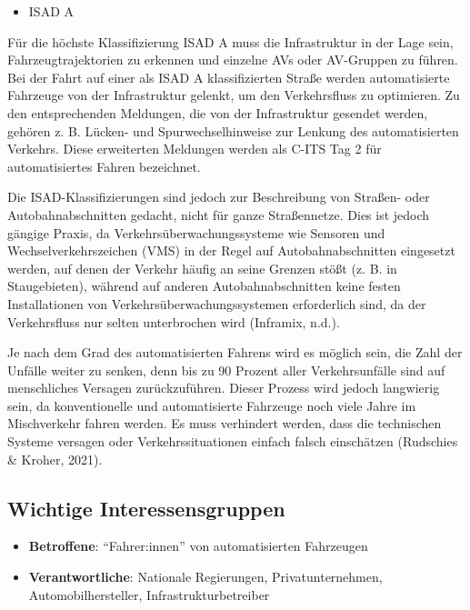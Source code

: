 \documentclass[
]{book}
\providecommand{\tightlist}{%
  \setlength{\itemsep}{0pt}\setlength{\parskip}{0pt}}
\begin{document}
\begin{itemize}
\tightlist
\item
  ISAD A
\end{itemize}

Für die höchste Klassifizierung ISAD A muss die Infrastruktur in der Lage sein, Fahrzeugtrajektorien zu erkennen und einzelne AVs oder AV-Gruppen zu führen. Bei der Fahrt auf einer als ISAD A klassifizierten Straße werden automatisierte Fahrzeuge von der Infrastruktur gelenkt, um den Verkehrsfluss zu optimieren. Zu den entsprechenden Meldungen, die von der Infrastruktur gesendet werden, gehören z. B. Lücken- und Spurwechselhinweise zur Lenkung des automatisierten Verkehrs. Diese erweiterten Meldungen werden als C-ITS Tag 2 für automatisiertes Fahren bezeichnet.

Die ISAD-Klassifizierungen sind jedoch zur Beschreibung von Straßen- oder Autobahnabschnitten gedacht, nicht für ganze Straßennetze. Dies ist jedoch gängige Praxis, da Verkehrsüberwachungssysteme wie Sensoren und Wechselverkehrszeichen (VMS) in der Regel auf Autobahnabschnitten eingesetzt werden, auf denen der Verkehr häufig an seine Grenzen stößt (z. B. in Staugebieten), während auf anderen Autobahnabschnitten keine festen Installationen von Verkehrsüberwachungssystemen erforderlich sind, da der Verkehrsfluss nur selten unterbrochen wird (Inframix, n.d.).

Je nach dem Grad des automatisierten Fahrens wird es möglich sein, die Zahl der Unfälle weiter zu senken, denn bis zu 90 Prozent aller Verkehrsunfälle sind auf menschliches Versagen zurückzuführen. Dieser Prozess wird jedoch langwierig sein, da konventionelle und automatisierte Fahrzeuge noch viele Jahre im Mischverkehr fahren werden. Es muss verhindert werden, dass die technischen Systeme versagen oder Verkehrssituationen einfach falsch einschätzen (Rudschies \& Kroher, 2021).

\hypertarget{wichtige-interessensgruppen-19}{%
\subsection*{Wichtige Interessensgruppen}\label{wichtige-interessensgruppen-19}}

\begin{itemize}
\tightlist
\item
  \textbf{Betroffene}: ``Fahrer:innen'' von automatisierten Fahrzeugen
\item
  \textbf{Verantwortliche}: Nationale Regierungen, Privatunternehmen, Automobilhersteller, Infrastrukturbetreiber
\end{itemize}
\end{document}
